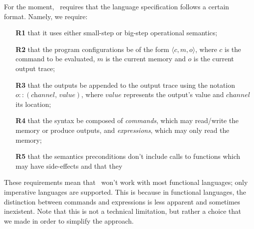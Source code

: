 \documentclass[conference]{IEEEtran}
\begin{document}
For the moment, \ottifc\ requires that the language specification follows a certain format. Namely, we require:
\begin{itemize}
	\item[\textbf{R1}] that it uses either small-step or big-step operational semantics;
	\item[\textbf{R2}] that the program configurations be of the form $\langle \textit{c}, \textit{m}, \textit{o}\rangle$, where $c$ is the command to be evaluated, $m$ is the current memory and $o$ is the current output trace;
	\item[\textbf{R3}] that the outputs be appended to the output trace using the notation $o\!::\!(\textit{channel},\, \textit{value})$, where $\textit{value}$ represents the output's value and $\textit{channel}$ its location;
	\item[\textbf{R4}] that the syntax be composed of \emph{commands}, which may read/write the memory or produce outputs, and \emph{expressions}, which may only read the memory;
	\item[\textbf{R5}] that the semantics preconditions don't include calls to functions which may have side-effects and that they 
\end{itemize}
These requirements mean that \ottifc\ won't work with most functional languages; only imperative languages are supported. This is because in functional languages, the distinction between commands and expressions is less apparent and sometimes inexistent. Note that this is not a technical limitation, but rather a choice that we made in order to simplify the approach. 

\end{document}
